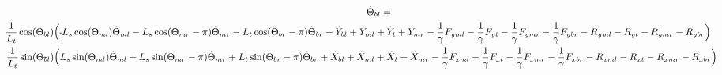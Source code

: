 \documentclass[11pt, landscape]{article}
\newcommand{\mn}{\scalebox{0.7}[1.0]{-}}
\begin{document}
\begin{multline}
\dot{\Theta}_{bl} = \\
\hspace*{-1.5cm}\frac{1}{L_t}\cos(\Theta_{bl})\Big( \mn L_{s}\cos(\Theta_{ml})\dot{\Theta}_{ml} - L_{s}\cos(\Theta_{mr}-\pi)\dot{\Theta}_{mr} - L_{t}\cos(\Theta_{br}-\pi)\dot{\Theta}_{br}
+ \dot{Y}_{bl} + \dot{Y}_{ml} + \dot{Y}_{t } + \dot{Y}_{mr} - \frac{1}{\gamma}F_{yml} - \frac{1}{\gamma}F_{yt } - \frac{1}{\gamma}F_{ymr} - \frac{1}{\gamma}F_{ybr} - R_{yml} - R_{yt} - R_{ymr} - R_{ybr} \Big)\\
- \hspace*{-1.5cm}\frac{1}{L_t}\sin(\Theta_{bl})\Big( L_{s}\sin(\Theta_{ml})\dot{\Theta}_{ml} + L_{s}\sin(\Theta_{mr}-\pi)\dot{\Theta}_{mr} + L_{t}\sin(\Theta_{br}-\pi)\dot{\Theta}_{br}
+ \dot{X}_{bl} + \dot{X}_{ml} + \dot{X}_{t } + \dot{X}_{mr} - \frac{1}{\gamma}F_{xml} - \frac{1}{\gamma}F_{xt } - \frac{1}{\gamma}F_{xmr} - \frac{1}{\gamma}F_{xbr} - R_{xml} - R_{xt } - R_{xmr} - R_{xbr} \Big)
\end{multline}
\end{document}

